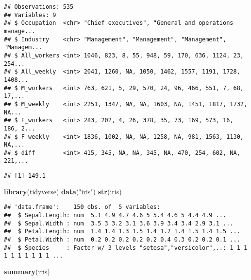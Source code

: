 \documentclass[]{article}
\newenvironment{Shaded}{\begin{snugshade}}{\end{snugshade}}
\newcommand{\KeywordTok}[1]{\textcolor[rgb]{0.13,0.29,0.53}{\textbf{#1}}}
\newcommand{\DataTypeTok}[1]{\textcolor[rgb]{0.13,0.29,0.53}{#1}}
\newcommand{\DecValTok}[1]{\textcolor[rgb]{0.00,0.00,0.81}{#1}}
\newcommand{\StringTok}[1]{\textcolor[rgb]{0.31,0.60,0.02}{#1}}
\newcommand{\OtherTok}[1]{\textcolor[rgb]{0.56,0.35,0.01}{#1}}
\newcommand{\OperatorTok}[1]{\textcolor[rgb]{0.81,0.36,0.00}{\textbf{#1}}}
\newcommand{\NormalTok}[1]{#1}
\begin{document}
\begin{verbatim}
## Observations: 535
## Variables: 9
## $ Occupation  <chr> "Chief executives", "General and operations manage...
## $ Industry    <chr> "Management", "Management", "Management", "Managem...
## $ All_workers <int> 1046, 823, 8, 55, 948, 59, 170, 636, 1124, 23, 254...
## $ All_weekly  <int> 2041, 1260, NA, 1050, 1462, 1557, 1191, 1728, 1408...
## $ M_workers   <int> 763, 621, 5, 29, 570, 24, 96, 466, 551, 7, 68, 17,...
## $ M_weekly    <int> 2251, 1347, NA, NA, 1603, NA, 1451, 1817, 1732, NA...
## $ F_workers   <int> 283, 202, 4, 26, 378, 35, 73, 169, 573, 16, 186, 2...
## $ F_weekly    <int> 1836, 1002, NA, NA, 1258, NA, 981, 1563, 1130, NA,...
## $ diff        <int> 415, 345, NA, NA, 345, NA, 470, 254, 602, NA, 221,...
\end{verbatim}

\begin{Shaded}
\end{Shaded}

\begin{verbatim}
## [1] 149.1
\end{verbatim}

\begin{Shaded}
\begin{Highlighting}[]
\KeywordTok{library}\NormalTok{(tidyverse)}
\KeywordTok{data}\NormalTok{(}\StringTok{"iris"}\NormalTok{)}
\KeywordTok{str}\NormalTok{(iris)}
\end{Highlighting}
\end{Shaded}

\begin{verbatim}
## 'data.frame':    150 obs. of  5 variables:
##  $ Sepal.Length: num  5.1 4.9 4.7 4.6 5 5.4 4.6 5 4.4 4.9 ...
##  $ Sepal.Width : num  3.5 3 3.2 3.1 3.6 3.9 3.4 3.4 2.9 3.1 ...
##  $ Petal.Length: num  1.4 1.4 1.3 1.5 1.4 1.7 1.4 1.5 1.4 1.5 ...
##  $ Petal.Width : num  0.2 0.2 0.2 0.2 0.2 0.4 0.3 0.2 0.2 0.1 ...
##  $ Species     : Factor w/ 3 levels "setosa","versicolor",..: 1 1 1 1 1 1 1 1 1 1 ...
\end{verbatim}

\begin{Shaded}
\begin{Highlighting}[]
\KeywordTok{summary}\NormalTok{(iris)}
\end{Highlighting}
\end{Shaded}
\end{document}
